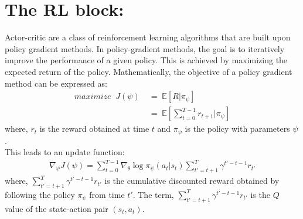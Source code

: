 \section*{The RL block:}

Actor-critic  are a class of reinforcement learning algorithms that are built upon policy gradient methods. 
In policy-gradient methods, the goal is to iteratively improve the performance of a given policy. This is achieved by maximizing the expected return of the policy. Mathematically, the objective of a policy gradient method can be expressed as:
\begin{align}
maximize \;\; J( \psi )  &\; = \; \mathbb{E} [ R | \pi_{\psi} ] \\
                       & \; = \; \mathbb{E}[ \sum^{T-1}_{t=0} r_{t+1}| \pi_{\psi}] 
\end{align}
where, $r_{t}$ is the reward obtained at time $t$ and $\pi_{\psi}$ is the policy with parameters $\psi$.\\
This leads to an update function:
\begin{align}
\label{eq:policy-gradient-update}
\nabla_{\psi} J (\psi) = \sum_{t=0}^{T-1} \nabla_{\theta}\log \pi_{\psi}(a_{t}|s_{t})\sum_{t'=t+1}^{T} \gamma^{t'-t-1} r_{t'}
\end{align} 
where, $\sum_{t'=t+1}^{T} \gamma^{t'-t-1} r_{t'}$ is the cumulative discounted reward obtained by following the policy $\pi_{\psi}$ from time $t'$. The term,  $\sum_{t'=t+1}^{T} \gamma^{t'-t-1} r_{t'}$ is the $Q$ value of the state-action pair $(s_{t}, a_{t})$.\\

